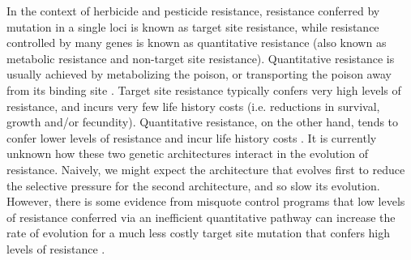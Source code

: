 \documentclass[12pt, a4paper]{article}
\begin{document}
In the context of herbicide and pesticide resistance, resistance conferred by mutation in a single loci is known as target site resistance, while resistance controlled by many genes is known as quantitative resistance (also known as metabolic resistance and non-target site resistance). Quantitative resistance is usually  achieved by metabolizing the poison, or transporting the poison away from its binding site \citep{Bauc2016}. Target site resistance typically confers very high levels of resistance, and incurs very few life history costs (i.e. reductions in survival, growth and/or fecundity). Quantitative resistance, on the other hand, tends to confer lower levels of resistance and incur life history costs \citep{Bauc2016}. It is currently unknown how these two genetic architectures interact in the evolution of resistance. Naively, we might expect the architecture that evolves first to reduce the selective pressure for the second architecture, and so slow its evolution. However, there is some evidence from misquote control programs that low levels of resistance conferred via an inefficient quantitative pathway can increase the rate of evolution for a much less costly target site mutation that confers high levels of resistance \citep{Vera2015}. 
\end{document}
